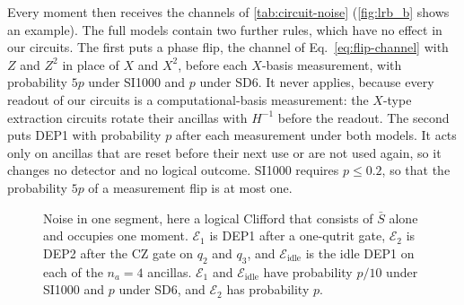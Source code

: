 Every moment then receives the channels of \autoref{tab:circuit-noise} (\autoref{fig:lrb_b} shows an example). The full models contain two further rules, which have no effect in our circuits. The first puts a phase flip, the channel of Eq.~\eqref{eq:flip-channel} with $Z$ and $Z^2$ in place of $X$ and $X^2$, before each $X$-basis measurement, with probability $5p$ under SI1000 and $p$ under SD6. It never applies, because every readout of our circuits is a computational-basis measurement: the $X$-type extraction circuits rotate their ancillas with $H^{-1}$ before the readout. The second puts DEP1 with probability $p$ after each measurement under both models. It acts only on ancillas that are reset before their next use or are not used again, so it changes no detector and no logical outcome. SI1000 requires $p \le 0.2$, so that the probability $5p$ of a measurement flip is at most one.

\begin{figure}[tp]
    \centering
    \caption{Noise in one segment, here a logical Clifford that consists of $\bar S$ alone and occupies one moment. $\mathcal{E}_1$ is DEP1 after a one-qutrit gate, $\mathcal{E}_2$ is DEP2 after the CZ gate on $q_2$ and $q_3$, and $\mathcal{E}_{\mathrm{idle}}$ is the idle DEP1 on each of the $n_a = 4$ ancillas. $\mathcal{E}_1$ and $\mathcal{E}_{\mathrm{idle}}$ have probability $p/10$ under SI1000 and $p$ under SD6, and $\mathcal{E}_2$ has probability $p$.}
    \label{fig:lrb_b}\label{fig:rounds_segment_noise}
\end{figure}

